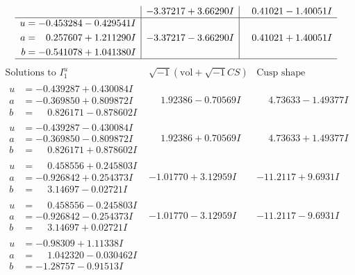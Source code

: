 \documentclass[1p]{elsarticle_modified}
\theoremstyle{definition}
\newcommand{\I}{\sqrt{-1}}
\begin{document}
$$\begin{array}{c|c|c}
 & -3.37217 + 3.66290 I & \phantom{-}0.41021 - 1.40051 I \\ \hline\begin{aligned}
u &= -0.453284 - 0.429541 I \\
a &= \phantom{-}0.257607 + 1.211290 I \\
b &= -0.541078 + 1.041380 I\end{aligned}
 & -3.37217 - 3.66290 I & \phantom{-}0.41021 + 1.40051 I\\
 \hline 
 \end{array}$$\newpage$$\begin{array}{c|c|c}  
\text{Solutions to }I^u_{1}& \I (\text{vol} + \sqrt{-1}CS) & \text{Cusp shape}\\
 \hline 
\begin{aligned}
u &= -0.439287 + 0.430084 I \\
a &= -0.369850 + 0.809872 I \\
b &= \phantom{-}0.826171 - 0.878602 I\end{aligned}
 & \phantom{-}1.92386 - 0.70569 I & \phantom{-}4.73633 - 1.49377 I \\ \hline\begin{aligned}
u &= -0.439287 - 0.430084 I \\
a &= -0.369850 - 0.809872 I \\
b &= \phantom{-}0.826171 + 0.878602 I\end{aligned}
 & \phantom{-}1.92386 + 0.70569 I & \phantom{-}4.73633 + 1.49377 I \\ \hline\begin{aligned}
u &= \phantom{-}0.458556 + 0.245803 I \\
a &= -0.926842 + 0.254373 I \\
b &= \phantom{-}3.14697 - 0.02721 I\end{aligned}
 & -1.01770 + 3.12959 I & -11.2117 + 9.6931 I \\ \hline\begin{aligned}
u &= \phantom{-}0.458556 - 0.245803 I \\
a &= -0.926842 - 0.254373 I \\
b &= \phantom{-}3.14697 + 0.02721 I\end{aligned}
 & -1.01770 - 3.12959 I & -11.2117 - 9.6931 I \\ \hline\begin{aligned}
u &= -0.98309 + 1.11338 I \\
a &= \phantom{-}1.042320 - 0.030462 I \\
b &= -1.28757 - 0.91513 I\end{aligned}

\end{array}$$
\end{document}
